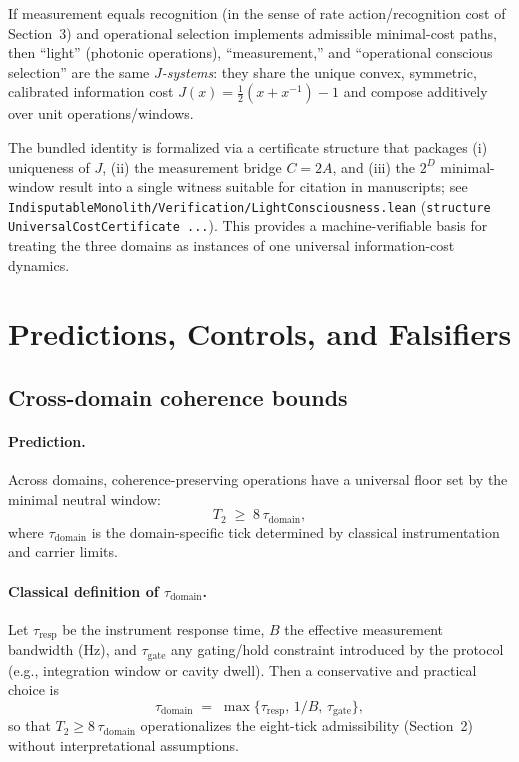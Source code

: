\documentclass[12pt,a4paper]{article}
\begin{document}
\begin{proposition}
If measurement equals recognition (in the sense of rate action/recognition cost of Section~3) and operational selection implements admissible minimal-cost paths, then “light” (photonic operations), “measurement,” and “operational conscious selection” are the same \emph{$J$-systems}: they share the unique convex, symmetric, calibrated information cost $J(x)=\tfrac{1}{2}(x+x^{-1})-1$ and compose additively over unit operations/windows.
\end{proposition}

\begin{remark}
The bundled identity is formalized via a certificate structure that packages (i) uniqueness of $J$, (ii) the measurement bridge $C=2A$, and (iii) the $2^{D}$ minimal-window result into a single witness suitable for citation in manuscripts; see \texttt{IndisputableMonolith/Verification/LightConsciousness.lean} (\texttt{structure UniversalCostCertificate ...}). This provides a machine-verifiable basis for treating the three domains as instances of one universal information-cost dynamics.
\end{remark}

\section{Predictions, Controls, and Falsifiers}

\subsection{Cross-domain coherence bounds}
\paragraph{Prediction.}
Across domains, coherence-preserving operations have a universal floor set by the minimal neutral window:
\[
  T_{2} \;\ge\; 8\,\tau_{\mathrm{domain}},
\]
where $\tau_{\mathrm{domain}}$ is the domain-specific tick determined by classical instrumentation and carrier limits.

\paragraph{Classical definition of $\tau_{\mathrm{domain}}$.}
Let $\tau_{\mathrm{resp}}$ be the instrument response time, $B$ the effective measurement bandwidth (Hz), and $\tau_{\mathrm{gate}}$ any gating/hold constraint introduced by the protocol (e.g., integration window or cavity dwell). Then a conservative and practical choice is
\[
  \tau_{\mathrm{domain}} \;=\; \max\!\bigl\{\tau_{\mathrm{resp}},\, 1/B,\, \tau_{\mathrm{gate}}\bigr\},
\]
so that $T_{2}\!\ge\!8\,\tau_{\mathrm{domain}}$ operationalizes the eight-tick admissibility (Section~2) without interpretational assumptions.
\end{document}
